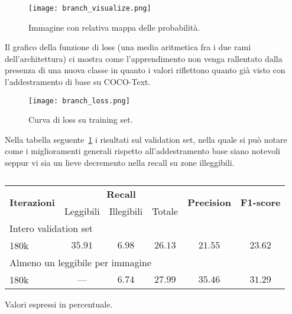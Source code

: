\begin{figure}[H]
	\centering
	\texttt{[image: branch\_visualize.png]}
	\caption{Immagine con relativa mappa delle probabilità.}
\label{fig:branch_visualize}
\end{figure}

Il grafico della funzione di loss (una media aritmetica fra i due rami dell'architettura) ci mostra come l'apprendimento non venga rallentato dalla presenza di una nuova classe in quanto i valori riflettono quanto già visto con l'addestramento di base su COCO-Text.

\begin{figure}[H]
	\centering
	\texttt{[image: branch\_loss.png]}
	\caption{Curva di loss su training set.}
\label{fig:branch_loss}
\end{figure}

Nella tabella seguente~\ref{tab:branch} i risultati sul validation set, nella quale si può notare come i miglioramenti generali rispetto all'addestramento base siano notevoli seppur vi sia un lieve decremento nella recall su zone illeggibili.


\begin{table}[H]
\centering
\begin{threeparttable}
	\begin{tabular}{l*{5}c}
		\toprule
		\multirow{2}{*}{\textbf{Iterazioni}} & \multicolumn{3}{c}{\textbf{Recall}} & \multirow{2}{*}{\textbf{Precision}} & \multirow{2}{*}{\textbf{F1-score}} \\
		\cmidrule(lr){2-4}
		& Leggibili & Illegibili & Totale &  &  \\
		\midrule
		\multicolumn{6}{l}{Intero validation set} \\
		180k		& $35.91$ & $6.98$ & $26.13$ & $21.55$ & $23.62$ \\
		\midrule
		\multicolumn{6}{l}{Almeno un leggibile per immagine} \\
		180k		&   ---   & $6.74$ & $27.99$ & $35.46$ & $31.29$ \\
		\bottomrule
	\end{tabular}
	\begin{tablenotes}
		\item \footnotesize{Valori espressi in percentuale.}
	\end{tablenotes}
\end{threeparttable}
\caption{}\label{tab:branch}
\end{table}


